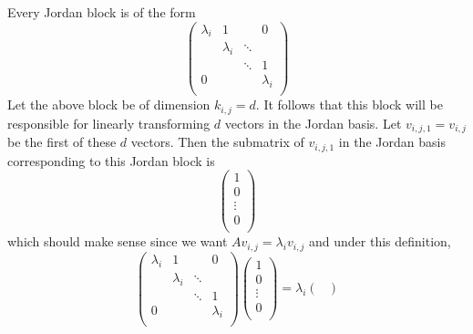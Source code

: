\documentclass[../notes.tex]{subfiles}
\begin{document}
\begin{itemize}
\begin{enumerate}
\begin{enumerate}
            Every Jordan block is of the form
            \begin{equation*}
                \begin{pmatrix}
                    \lambda_i & 1 &  & 0\\
                     & \lambda_i & \ddots & \\
                     &  & \ddots & 1\\
                    0 &  &  & \lambda_i\\
                \end{pmatrix}
            \end{equation*}
            Let the above block be of dimension $k_{i,j}=d$. It follows that this block will be responsible for linearly transforming $d$ vectors in the Jordan basis. Let $v_{i,j,1}=v_{i,j}$ be the first of these $d$ vectors. Then the submatrix of $v_{i,j,1}$ in the Jordan basis corresponding to this Jordan block is
            \begin{equation*}
                \begin{pmatrix}
                    1\\
                    0\\
                    \vdots\\
                    0\\
                \end{pmatrix}
            \end{equation*}
            which should make sense since we want $Av_{i,j}=\lambda_iv_{i,j}$ and under this definition,
            \begin{equation*}
                \begin{pmatrix}
                    \lambda_i & 1 &  & 0\\
                     & \lambda_i & \ddots & \\
                     &  & \ddots & 1\\
                    0 &  &  & \lambda_i\\
                \end{pmatrix}
                \begin{pmatrix}
                    1\\
                    0\\
                    \vdots\\
                    0\\
                \end{pmatrix}
                = \lambda_i
                \begin{pmatrix}

\end{pmatrix}
\end{equation*}
\end{enumerate}
\end{enumerate}
\end{itemize}
\end{document}
